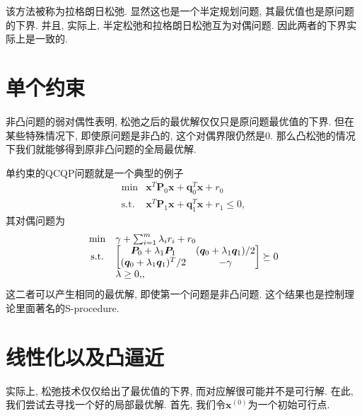 \documentclass[a4paper,12pt]{article}
\begin{document}
该方法被称为拉格朗日松弛.
显然这也是一个半定规划问题, 其最优值也是原问题的下界.
并且, 实际上, 半定松弛和拉格朗日松弛互为对偶问题.
因此两者的下界实际上是一致的.

\section{单个约束}
非凸问题的弱对偶性表明, 松弛之后的最优解仅仅只是原问题最优值的下界. 
但在某些特殊情况下, 即使原问题是非凸的, 这个对偶界限仍然是$0$. 
那么凸松弛的情况下我们就能够得到原非凸问题的全局最优解.

单约束的QCQP问题就是一个典型的例子
\begin{equation} 
\begin{array}{cl}
{\min}  & {\bm{x}^T \bm{P}_0 \bm{x} + \bm{q}_0^T \bm{x} + r_0} \\
{\text{s.t.}} & {\bm{x}^T \bm{P}_1 \bm{x} + \bm{q}_1^T \bm{x} + r_1 \leq 0},
\end{array}
\end{equation}
其对偶问题为
\begin{equation}
\begin{array} { c l } 
{\min} & { \gamma + \sum_{i=1}^{m} \lambda_{i} r_{i} + r_{0} } \\ 
{\text {s.t.}} & 
{\begin{bmatrix} 
{\bm{P}_0 + \lambda_1 \bm{P}_1} & {(\bm{q}_0 + \lambda_1 \bm{q}_1)/2} \\
{(\bm{q}_0 +  \lambda_1 \bm{q}_1)^T/2} & {-\gamma}
\end{bmatrix} \succeq 0} \\ 
{} & {\lambda \ge 0,}, 
\end{array}
\end{equation}
这二者可以产生相同的最优解, 即使第一个问题是非凸问题.
这个结果也是控制理论里面著名的S-procedure.

\section{线性化以及凸逼近}
实际上, 松弛技术仅仅给出了最优值的下界, 而对应解很可能并不是可行解.
在此, 我们尝试去寻找一个好的局部最优解.
首先, 我们令$\bm{x}^{(0)}$为一个初始可行点.
\end{document}
